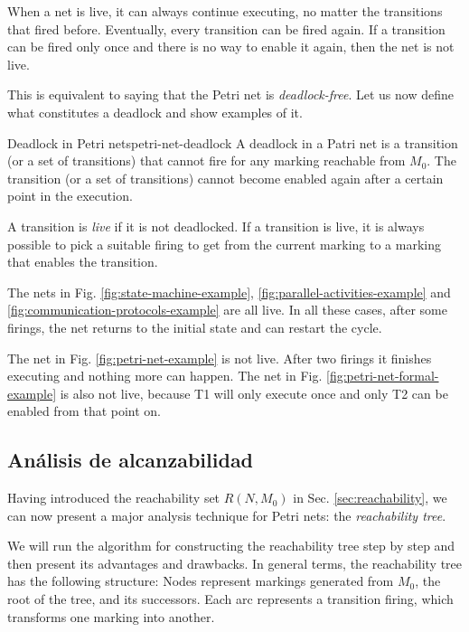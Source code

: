 When a net is live, it can always continue executing,
no matter the transitions that fired before.
Eventually, every transition can be fired again.
If a transition can be fired only once and there is no way to enable it again,
then the net is not live.

This is equivalent to saying that the Petri net is \emph{deadlock-free}.
Let us now define what constitutes a deadlock and show examples of it.

\begin{definition}{Deadlock in Petri nets}{petri-net-deadlock}
      A deadlock in a Patri net is a transition (or a set of transitions) that cannot fire
      for any marking reachable from $M_0$.
      The transition (or a set of transitions) cannot become enabled again
      after a certain point in the execution.
\end{definition}

A transition is \emph{live} if it is not deadlocked.
If a transition is live, it is always possible to pick a suitable firing
to get from the current marking to a marking that enables the transition.

The nets in Fig. \ref{fig:state-machine-example}, \ref{fig:parallel-activities-example}
and \ref{fig:communication-protocols-example} are all live.
In all these cases, after some firings,
the net returns to the initial state and can restart the cycle.

The net in Fig. \ref{fig:petri-net-example} is not live.
After two firings it finishes executing and nothing more can happen.
The net in Fig. \ref{fig:petri-net-formal-example} is also not live, because
T1 will only execute once and only T2 can be enabled from that point on.

\subsection{Análisis de alcanzabilidad}

Having introduced the reachability set $R(N, M_0)$ in Sec. \ref{sec:reachability},
we can now present a major analysis technique for Petri nets: the \emph{reachability tree}.

We will run the algorithm for constructing the reachability tree step by step
and then present its advantages and drawbacks.
In general terms, the reachability tree has the following structure:
Nodes represent markings generated from $M_0$, the root of the tree, and its successors.
Each arc represents a transition firing, which transforms one marking into another.

